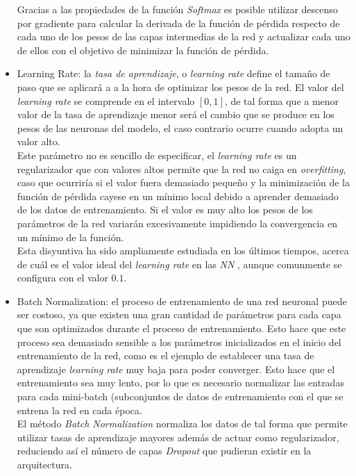\begin{itemize}
                    Gracias a las propiedades de la función \textit{Softmax} es posible utilizar descenso por gradiente para calcular la derivada de la función de pérdida respecto de cada uno de los pesos de las capas intermedias de la red y actualizar cada uno de ellos con el objetivo de minimizar la función de pérdida.

                \item Learning Rate: la \textit{tasa de aprendizaje}, o \textit{learning rate} define el tamaño de paso que se aplicará a a la hora de optimizar los pesos de la red. El valor del \textit{learning rate} se comprende en el intervalo $[0,1]$, de tal forma que a menor valor de la tasa de aprendizaje menor será el cambio que se produce en los pesos de las neuronas del modelo, el caso contrario ocurre cuando adopta un valor alto.\\



                    Este parámetro no es sencillo de especificar, el \textit{learning rate} es un regularizador que con valores altos permite que la red no caiga en \textit{overfitting}, caso que ocurriría si el valor fuera demasiado pequeño y la minimización de la función de pérdida cayese en un mínimo local debido a aprender demasiado de los datos de entrenamiento. Si el valor es muy alto los pesos de los parámetros de la red variarán excesivamente impidiendo la convergencia en un mínimo de la función.\\

                    Esta disyuntiva ha sido ampliamente estudiada en los últimos tiempos, acerca de cuál es el valor ideal del \textit{learning rate} en las \textit{NN} \cite{LearningRate}, aunque comunmente se configura con el valor $0.1$.



                \item Batch Normalization: el proceso de entrenamiento de una red neuronal puede ser costoso, ya que existen una gran cantidad de parámetros para cada capa que son optimizados durante el proceso de entrenamiento. Esto hace que este proceso sea demasiado sensible a los parámetros inicializados en el inicio del entrenamiento de la red, como es el ejemplo de establecer una tasa de aprendizaje \textit{learning rate} muy baja para poder converger. Esto hace que el entrenamiento sea muy lento, por lo que es necesario normalizar las entradas para cada mini-batch (subconjuntos de datos de entrenamiento con el que se entrena la red en cada época.\\


                    El método \textit{Batch Normalization} \cite{BatchNormalization} normaliza los datos de tal forma que permite utilizar tasas de aprendizaje mayores además de actuar como regularizador, reduciendo así el número de capas \textit{Dropout} que pudieran existir en la arquitectura.

            \end{itemize}

